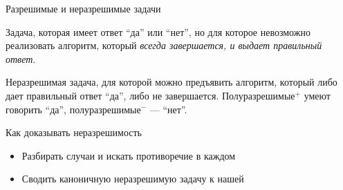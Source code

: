  \begin{frame}{Разрешимые и неразрешимые задачи}
 	\begin{definition}
 		Задача, которая имеет ответ ``да'' или ``нет'', но для которое невозможно реализовать алгоритм, который \emph{всегда завершается, и выдает правильный ответ}.
 	\end{definition}
 	\begin{definition}
 		Неразрешимая задача, для которой можно предъявить алгоритм, который либо дает правильный ответ  ``да'', либо не завершается. Полуразрешимые$^{+}$ умеют говорить ``да'', полуразрешимые$^{-}$ --- ``нет''.
 	\end{definition}
 	Как доказывать неразрешимость
 	\begin{itemize}
 		\item Разбирать случаи и искать противоречие в каждом
 		\item Сводить каноничную неразрешимую задачу к нашей
 	\end{itemize}
 \end{frame}

